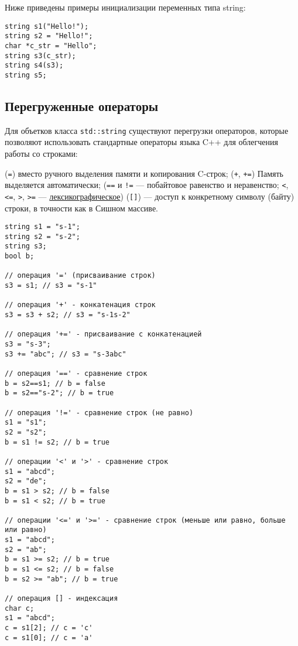 Ниже приведены примеры инициализации переменных типа string:
\begin{verbatim}
string s1("Hello!");
string s2 = "Hello!";
char *c_str = "Hello";
string s3(c_str);
string s4(s3);
string s5;
\end{verbatim}

\subsection{Перегруженные операторы}
Для объетков класса \verb|std::string| существуют перегрузки операторов,
которые позволяют использовать стандартные операторы языка C++ для облегчения
работы со строками:
\begin{itemize}
   (\verb|=|) вместо ручного выделения памяти и копирования C-строк;
   (\verb|+|, \verb|+=|) Память выделяется автоматически;
   (\verb|==| и \verb|!=| --- побайтовое равенство и неравенство; \verb|<|, \verb|<=|, \verb|>|, \verb|>=|
  --- \hyperref[def:lex_cmp]{лексикографическое})
   (\verb|[]|) --- доступ к конкретному символу (байту) строки, в точности как в Сишном массиве.
\end{itemize}
\begin{verbatim}
string s1 = "s-1";
string s2 = "s-2";
string s3;
bool b;

// операция '=' (присваивание строк)
s3 = s1; // s3 = "s-1"

// операция '+' - конкатенация строк
s3 = s3 + s2; // s3 = "s-1s-2"

// операция '+=' - присваивание с конкатенацией
s3 = "s-3";
s3 += "abc"; // s3 = "s-3abc"

// операция '==' - сравнение строк
b = s2==s1; // b = false
b = s2=="s-2"; // b = true

// операция '!=' - сравнение строк (не равно)
s1 = "s1";
s2 = "s2";
b = s1 != s2; // b = true

// операции '<' и '>' - сравнение строк
s1 = "abcd";
s2 = "de";
b = s1 > s2; // b = false
b = s1 < s2; // b = true

// операции '<=' и '>=' - сравнение строк (меньше или равно, больше или равно)
s1 = "abcd";
s2 = "ab";
b = s1 >= s2; // b = true
b = s1 <= s2; // b = false
b = s2 >= "ab"; // b = true

// операция [] - индексация
char c;
s1 = "abcd";
c = s1[2]; // c = 'c'
c = s1[0]; // c = 'a'
\end{verbatim}

